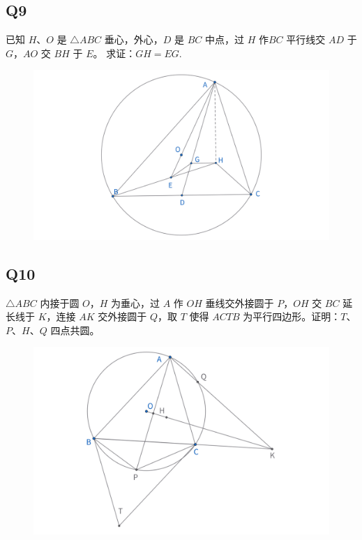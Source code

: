 \documentclass{article}
\begin{document}
\subsection{Q9}
已知 $H$、$O$ 是 $\triangle ABC$ 垂心，外心，$D$ 是 $BC$ 中点，过 $H$ 作$BC$ 平行线交 $AD$ 于 $G$，$AO$ 交 $BH$ 于 $E$。
求证：$GH = EG.$
\begin{figure}[htbp]
    \centering
    \includegraphics[width=0.9\linewidth]{figures/Q9.png}
\end{figure}
\newpage
\subsection{Q10}
$\triangle ABC$ 内接于圆 $O$，$H$ 为垂心，过 $A$ 作 $OH$ 垂线交外接圆于 $P$，$OH$ 交 $BC$ 延长线于 $K$，连接 $AK$ 交外接圆于 $Q$，取 $T$ 使得 $ACTB$ 为平行四边形。证明：$T$、$P$、$H$、$Q$ 四点共圆。
\begin{figure}[htbp]
    \centering
    \includegraphics[width=0.9\linewidth]{figures/Q10.png}
\end{figure}
\end{document}
